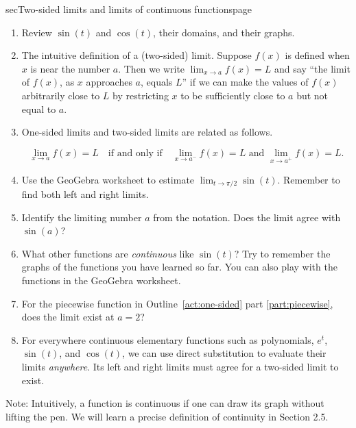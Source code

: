 \documentclass[../main.tex]{subfiles}
\begin{document}
\begin{outline}{sec}{Two-sided limits and limits of continuous functions}{page}
  \label{act:two-sided}
  \begin{enumerate}
    \item Review \(\sin(t)\) and \(\cos(t)\), their domains, and their graphs.
    \item The intuitive definition of a (two-sided) limit. Suppose \(f(x)\) is defined when \(x\) is near the number \(a\). Then we write \(\lim_{x \to a} f(x) = L\) and say ``the limit of \(f(x)\), as \(x\) approaches \(a\), equals \(L\)'' if we can make the values of \(f(x)\) arbitrarily close to \(L\) by restricting \(x\) to be sufficiently close to \(a\) but not equal to \(a\).
    \item One-sided limits and two-sided limits are related as follows.
          \begin{mdframed}[style=simple]
            \[
              \lim_{x \to a} f(x) = L
              \quad\text{if and only if}\quad
              \lim_{x \to a^{-}} f(x) = L \text{ and }
              \lim_{x \to a^{+}} f(x) = L.
            \]
          \end{mdframed}
    \item Use the GeoGebra worksheet to estimate \(\lim_{t \to \pi/2} \sin(t)\). Remember to find both left and right limits.
    \item Identify the limiting number \(a\) from the notation. Does the limit agree with \(\sin(a)\)?
    \item What other functions are \emph{continuous} like \(\sin(t)\)? Try to remember the graphs of the functions you have learned so far. You can also play with the functions in the GeoGebra worksheet.
    \item For the piecewise function in Outline~\ref{act:one-sided} part \eqref{part:piecewise}, does the limit exist at \(a = 2\)?
    \item For everywhere continuous elementary functions such as polynomials, \(e^{t}\), \(\sin(t)\), and \(\cos(t)\), we can use direct substitution to evaluate their limits \emph{anywhere}. Its left and right limits must agree for a two-sided limit to exist.
  \end{enumerate}

  Note: Intuitively, a function is continuous if one can draw its graph without lifting the pen. We will learn a precise definition of continuity in Section 2.5.
\end{outline}
\end{document}
